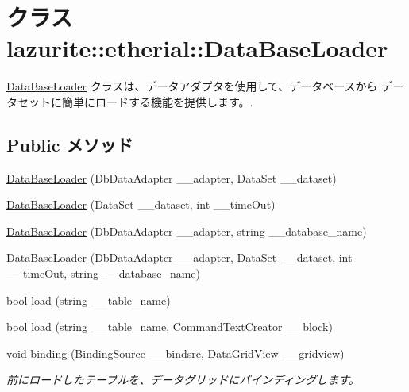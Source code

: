 \hypertarget{classlazurite_1_1etherial_1_1_data_base_loader}{
\section{クラス lazurite::etherial::DataBaseLoader}
\label{classlazurite_1_1etherial_1_1_data_base_loader}
}


\hyperlink{classlazurite_1_1etherial_1_1_data_base_loader}{DataBaseLoader} クラスは、データアダプタを使用して、データベースから データセットに簡単にロードする機能を提供します。.  
\subsection*{Public メソッド}
\begin{DoxyCompactItemize}
\item 
\hyperlink{classlazurite_1_1etherial_1_1_data_base_loader_a1008de3808b48a9415aeddb84b506e7a}{DataBaseLoader} (DbDataAdapter \_\-\_\-adapter, DataSet \_\-\_\-dataset)
\item 
\hyperlink{classlazurite_1_1etherial_1_1_data_base_loader_a765c3fc303a0faeb62d3152947da5558}{DataBaseLoader} (DataSet \_\-\_\-dataset, int \_\-\_\-timeOut)
\item 
\hyperlink{classlazurite_1_1etherial_1_1_data_base_loader_aa2a43059ad5d48167b70f83850b5cee0}{DataBaseLoader} (DbDataAdapter \_\-\_\-adapter, string \_\-\_\-database\_\-name)
\item 
\hyperlink{classlazurite_1_1etherial_1_1_data_base_loader_abaac2cdc7ca5defd6e0bc239ddfb17f7}{DataBaseLoader} (DbDataAdapter \_\-\_\-adapter, DataSet \_\-\_\-dataset, int \_\-\_\-timeOut, string \_\-\_\-database\_\-name)
\item 
bool \hyperlink{classlazurite_1_1etherial_1_1_data_base_loader_a5f042af6f723cbf7f7b74a7d6290ba27}{load} (string \_\-\_\-table\_\-name)
\item 
bool \hyperlink{classlazurite_1_1etherial_1_1_data_base_loader_afbe7dcab9574865fb2e22d87e5649254}{load} (string \_\-\_\-table\_\-name, CommandTextCreator \_\-\_\-block)
\item 
void \hyperlink{classlazurite_1_1etherial_1_1_data_base_loader_ab727726afae6a0b2a05651462231fb42}{binding} (BindingSource \_\-\_\-bindsrc, DataGridView \_\-\_\-gridview)
\begin{DoxyCompactList}\small\item\em 前にロードしたテーブルを、データグリッドにバインディングします。 \item\end{DoxyCompactList}\item 

\end{DoxyCompactItemize}
